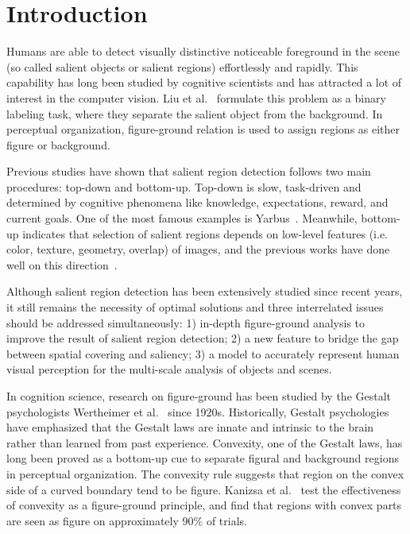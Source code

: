\documentclass{article}
\begin{document}
\section{Introduction}
\label{sec:intro}
Humans are able to detect visually distinctive noticeable foreground in the scene (so called salient objects or salient regions) effortlessly and rapidly. This capability has long been studied by cognitive scientists and has attracted a lot of interest in the computer vision. Liu et al.~\cite{liu2011learning} formulate this problem as a binary labeling task, where they separate the salient object from the background. In perceptual organization, figure-ground relation is used to assign regions as either figure or background.

Previous studies have shown that salient region detection follows two main procedures: top-down and bottom-up. Top-down is slow, task-driven and determined by cognitive phenomena like knowledge, expectations, reward, and current goals. One of the most famous examples is Yarbus~\cite{al1967eye}. Meanwhile, bottom-up indicates that selection of salient regions depends on low-level features (i.e. color, texture, geometry, overlap) of images, and the previous works have done well on this direction~\cite{lu2011salient}\cite{cheng2015global}\cite{achanta2009frequency}\cite{zhai2006visual}\cite{hou2007saliency}.

Although salient region detection has been extensively studied since recent years, it still remains the necessity of optimal solutions and three interrelated issues should be addressed simultaneously: 1) in-depth figure-ground analysis to improve the result of salient region detection; 2) a new feature to bridge the gap between spatial covering and saliency; 3) a model to accurately represent human visual perception for the multi-scale analysis of objects and scenes.

In cognition science, research on figure-ground has been studied by the Gestalt psychologists Wertheimer et al.~\cite{wertheimer1923untersuchungen} since 1920s. Historically, Gestalt psychologies have emphasized that the Gestalt laws are innate and intrinsic to the brain rather than learned from past experience. Convexity, one of the Gestalt laws, has long been proved as a bottom-up cue to separate figural and background regions in perceptual organization. The convexity rule suggests that region on the convex side of a curved boundary tend to be figure. Kanizsa et al.~\cite{kanizsa1976convexity} test the effectiveness of convexity as a figure-ground principle, and find that regions with convex parts are seen as figure on approximately $90\%$ of trials. 
\end{document}
